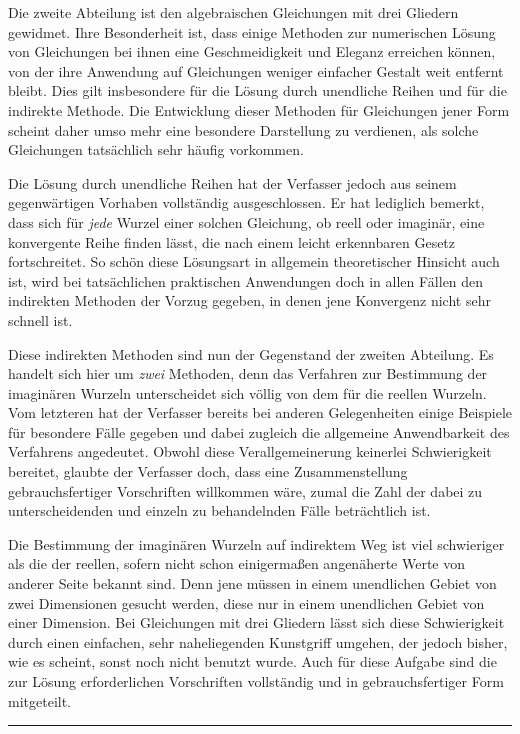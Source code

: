 Die zweite Abteilung ist den algebraischen Gleichungen mit drei Gliedern gewidmet. Ihre Besonderheit ist, dass einige Methoden zur numerischen Lösung von Gleichungen bei ihnen eine Geschmeidigkeit und Eleganz erreichen können, von der ihre Anwendung auf Gleichungen weniger einfacher Gestalt weit entfernt bleibt. Dies gilt insbesondere für die Lösung
durch unendliche Reihen und für die indirekte Methode. Die Entwicklung dieser Methoden für Gleichungen jener Form scheint daher umso mehr eine besondere Darstellung zu verdienen, als solche Gleichungen tatsächlich sehr häufig vorkommen.

Die Lösung durch unendliche Reihen hat der Verfasser jedoch aus seinem gegenwärtigen Vorhaben vollständig ausgeschlossen. Er hat lediglich bemerkt, dass sich für \textit{jede} Wurzel einer solchen Gleichung, ob reell oder imaginär, eine konvergente Reihe finden lässt, die nach einem leicht erkennbaren Gesetz fortschreitet. So schön diese Lösungsart in allgemein theoretischer Hinsicht auch ist, wird bei tatsächlichen praktischen Anwendungen doch in allen Fällen den indirekten Methoden der Vorzug gegeben, in denen jene Konvergenz nicht sehr schnell ist.

Diese indirekten Methoden sind nun der Gegenstand der zweiten Abteilung. Es handelt sich hier um \textit{zwei} Methoden, denn das Verfahren zur Bestimmung der imaginären Wurzeln unterscheidet sich völlig von dem für die reellen Wurzeln. Vom letzteren hat der Verfasser bereits bei anderen Gelegenheiten einige Beispiele für besondere Fälle gegeben und dabei zugleich die allgemeine Anwendbarkeit des Verfahrens angedeutet. Obwohl diese Verallgemeinerung keinerlei Schwierigkeit bereitet, glaubte der Verfasser doch, dass eine Zusammenstellung gebrauchsfertiger Vorschriften willkommen wäre, zumal die Zahl der dabei zu unterscheidenden und einzeln zu behandelnden Fälle beträchtlich ist.

Die Bestimmung der imaginären Wurzeln auf indirektem Weg ist viel schwieriger als die der reellen, sofern nicht schon einigermaßen angenäherte Werte von anderer Seite bekannt sind. Denn jene müssen in einem unendlichen Gebiet von zwei Dimensionen gesucht werden, diese nur in einem unendlichen Gebiet von einer Dimension. Bei Gleichungen mit drei Gliedern lässt sich diese Schwierigkeit durch einen einfachen, sehr naheliegenden Kunstgriff umgehen, der jedoch bisher, wie es scheint, sonst noch nicht benutzt wurde. Auch für diese Aufgabe sind die zur Lösung erforderlichen Vorschriften vollständig und in gebrauchsfertiger Form mitgeteilt.
\par\noindent\hfill\rule{0.30\linewidth}{0.4pt}\hfill\mbox{}\par

